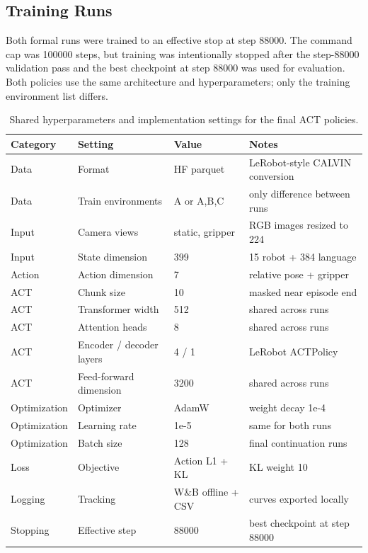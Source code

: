 \documentclass[10pt,twocolumn]{article}
\begin{document}
\subsection{Training Runs}

Both formal runs were trained to an effective stop at step 88000. The command cap was 100000 steps, but training was intentionally stopped after the step-88000 validation pass and the best checkpoint at step 88000 was used for evaluation. Both policies use the same architecture and hyperparameters; only the training environment list differs.

\begin{table}[t]
\centering
\caption{Shared hyperparameters and implementation settings for the final ACT policies.}
\label{tab:hparams}
\begin{tabular}{llll}
\toprule
Category & Setting & Value & Notes \\
\midrule
Data & Format & HF parquet & LeRobot-style CALVIN conversion \\
Data & Train environments & A or A,B,C & only difference between runs \\
Input & Camera views & static, gripper & RGB images resized to 224 \\
Input & State dimension & 399 & 15 robot + 384 language \\
Action & Action dimension & 7 & relative pose + gripper \\
ACT & Chunk size & 10 & masked near episode end \\
ACT & Transformer width & 512 & shared across runs \\
ACT & Attention heads & 8 & shared across runs \\
ACT & Encoder / decoder layers & 4 / 1 & LeRobot ACTPolicy \\
ACT & Feed-forward dimension & 3200 & shared across runs \\
Optimization & Optimizer & AdamW & weight decay 1e-4 \\
Optimization & Learning rate & 1e-5 & same for both runs \\
Optimization & Batch size & 128 & final continuation runs \\
Loss & Objective & Action L1 + KL & KL weight 10 \\
Logging & Tracking & W\&B offline + CSV & curves exported locally \\
Stopping & Effective step & 88000 & best checkpoint at step 88000 \\
\bottomrule
\end{tabular}
\end{table}
\end{document}
